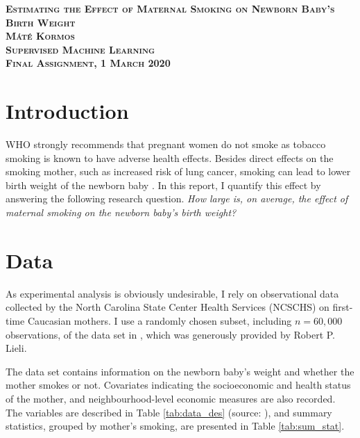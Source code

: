 \documentclass[a4paper,12pt]{article}
\begin{document}
\pagestyle{fancy}
\thispagestyle{myplain}
\begin{center}
{\large
\textbf{\textsc{Estimating the Effect of Maternal Smoking on Newborn Baby's Birth Weight}} \\
\vspace{0.2cm}
\textbf{\textsc{Máté Kormos}} }\\
\vspace{0.5cm}
\textbf{\textsc{Supervised Machine Learning}} \\
\textbf{\textsc{Final Assignment, 1 March 2020}}

\end{center}
\vspace{1cm}


\section{Introduction}


\noindent WHO strongly recommends that pregnant women do not smoke \citep{whopregnancy} as tobacco smoking is known to have adverse health effects. Besides direct effects on the smoking mother, such as increased risk of lung cancer,  smoking can lead to lower birth weight of the newborn baby \citep{whosmoking}. In this report, I quantify this effect by answering the following research question. \textit{How large is, on average, the effect of maternal smoking on the newborn baby's birth weight?}



\section{Data}

\noindent As experimental analysis is obviously undesirable, I rely on observational data collected by the North Carolina State Center Health Services (NCSCHS) on first-time Caucasian mothers. I use a randomly chosen subset, including $n=60,000$ observations, of the data set in \cite{abrevaya2015}, which was generously provided by Robert P. Lieli.

\noindent The data set contains information on the newborn baby's weight and whether the mother smokes or not. Covariates indicating the socioeconomic and health status of the mother, and neighbourhood-level economic measures are also recorded. The variables are described in Table \ref{tab:data_des} (source: \cite{fan2019}), and summary statistics, grouped by mother's smoking, are presented in Table \ref{tab:sum_stat}.
\end{document}
